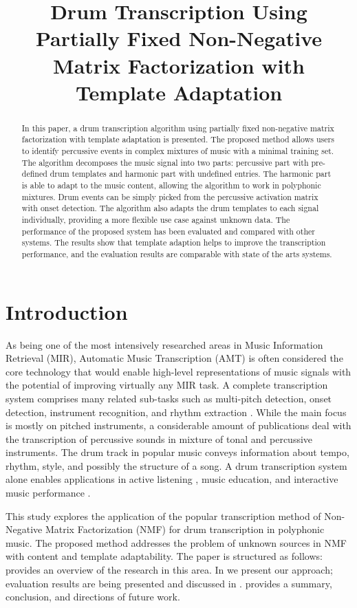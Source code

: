 \documentclass{article}
\title{Drum Transcription Using Partially Fixed Non-Negative Matrix Factorization with Template Adaptation}
\begin{document}
%
\maketitle
%
\begin{abstract}
In this paper, a drum transcription algorithm using partially fixed non-negative matrix factorization with template adaptation is presented. The proposed method allows users to identify percussive events in complex mixtures of music with a minimal training set. The algorithm decomposes the music signal into two parts: percussive part with pre-defined drum templates and harmonic part with undefined entries. The harmonic part is able to adapt to the music content, allowing the algorithm to work in polyphonic mixtures. Drum events can be simply picked from the percussive activation matrix with onset detection. The algorithm also adapts the drum templates to each signal individually, providing a more flexible use case against unknown data. The performance of the proposed system has been evaluated and compared with other systems. The results show that template adaption helps to improve the transcription performance, and the evaluation results are comparable with state of the arts systems.  

\end{abstract}
%

\section{Introduction}\label{sec:introduction}
As being one of the most intensively researched areas in Music Information Retrieval (MIR), Automatic Music Transcription (AMT) is often considered the core technology that would enable high-level representations of music signals with the potential of improving virtually any MIR task. A complete transcription system comprises many related sub-tasks such as multi-pitch detection, onset detection, instrument recognition, and rhythm extraction \cite{benetos_automatic_2013}. While the main focus is mostly on pitched instruments, a considerable amount of publications deal with the transcription of percussive sounds in mixture of tonal and percussive instruments. The drum track in popular music conveys information about tempo, rhythm, style, and possibly the structure of a song. A drum transcription system alone enables applications in active listening \cite{yoshii_drumix:_2007}, music education, and interactive music performance \cite{weinberg_interactive_2009}.

This study explores the application of the popular transcription method of Non-Negative Matrix Factorization (NMF) for drum transcription in polyphonic music. The proposed method addresses the problem of unknown sources in NMF with content and template adaptability. The paper is structured as follows:  provides an overview of the research in this area. In  we present our approach; evaluation results are being presented and discussed in .  provides a summary, conclusion, and directions of future work.
\end{document}

